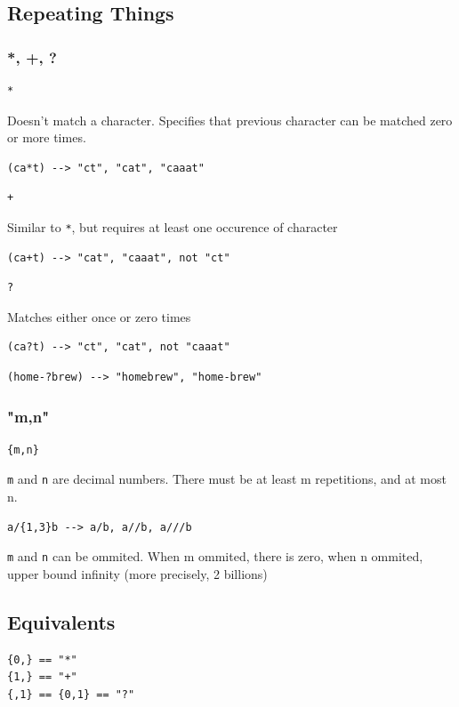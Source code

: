\documentclass{beamer}
\begin{document}
\subsection{Repeating Things}
\subsubsection{*, +, ?}
\begin{frame}[fragile]
\begin{verbatim}
*
\end{verbatim}
Doesn't match a character. Specifies that previous character can be matched zero or more times.
\begin{verbatim}
(ca*t) --> "ct", "cat", "caaat"
\end{verbatim}
\pause
\begin{verbatim}
+
\end{verbatim}
Similar to \verb/*/, but requires at least one occurence of character
\begin{verbatim}
(ca+t) --> "cat", "caaat", not "ct"
\end{verbatim}
\pause
\begin{verbatim}
?
\end{verbatim}
Matches either once or zero times
\begin{verbatim}
(ca?t) --> "ct", "cat", not "caaat"
\end{verbatim}
\pause
\begin{verbatim}
(home-?brew) --> "homebrew", "home-brew"
\end{verbatim}
\end{frame}

\subsubsection{"{m,n}"}
\begin{frame}[fragile]
\begin{verbatim}
{m,n}
\end{verbatim}
\verb/m/ and \verb/n/ are decimal numbers. There must be at least m repetitions, and at most n.
\begin{verbatim}
a/{1,3}b --> a/b, a//b, a///b
\end{verbatim}
\pause
\verb/m/ and \verb/n/ can be ommited. When m ommited, there is zero, when n ommited, upper bound infinity (more precisely, 2 billions)
\end{frame}

\subsection{Equivalents}
\begin{frame}[fragile]
\begin{verbatim}
{0,} == "*"
{1,} == "+"
{,1} == {0,1} == "?"
\end{verbatim}
\end{frame}
\end{document}
